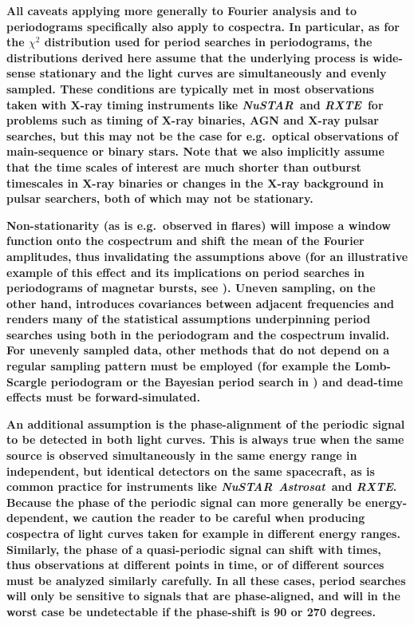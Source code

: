\documentclass[12pt]{emulateapj}
\newcommand{\project}[1]{\textsl{#1}}
\newcommand{\nustar}{\project{NuSTAR}\xspace}
\newcommand{\rxte}{\project{RXTE}\xspace}
\newcommand{\astrosat}{\project{Astrosat}\xspace}
\begin{document}
\textbf{All caveats applying more generally to Fourier analysis and to periodograms specifically also apply to cospectra. In particular, as for the $\chi^2$ distribution used for period searches in periodograms, the distributions derived here assume that the underlying process is wide-sense stationary and the light curves are simultaneously and evenly sampled. These conditions are typically met in most observations taken with X-ray timing instruments like \nustar\ and \rxte\ for problems such as timing of X-ray binaries, AGN and X-ray pulsar searches, but this may not be the case for e.g.\ optical observations of main-sequence or binary stars. Note that we also implicitly assume that the time scales of interest are much shorter than outburst timescales in X-ray binaries or changes in the X-ray background in pulsar searchers, both of which may not be stationary.}

\textbf{Non-stationarity (as is e.g.\ observed in flares) will impose a window function onto the cospectrum and shift the mean of the Fourier amplitudes, thus invalidating the assumptions above (for an illustrative example of this effect and its implications on period searches in periodograms of magnetar bursts, see \citealt{huppenkothen2013}). Uneven sampling, on the other hand, introduces covariances between adjacent frequencies and renders many of the statistical assumptions underpinning period searches using both in the periodogram and the cospectrum invalid. For unevenly sampled data, other methods that do not depend on a regular sampling pattern must be employed (for example the Lomb-Scargle periodogram \citep{lomb1976, scargle1982} or the Bayesian period search in \citet{gregory1992}) and dead-time effects must be forward-simulated.}

\textbf{An additional assumption is the phase-alignment of the periodic signal to be detected in both light curves. This is always true when the same source is observed simultaneously in the same energy range in independent, but identical detectors on the same spacecraft, as is common practice for instruments like \nustar\, \astrosat\ and \rxte. Because the phase of the periodic signal can more generally be energy-dependent, we caution the reader to be careful when producing cospectra of light curves taken for example in different energy ranges. Similarly, the phase of a quasi-periodic signal can shift with times, thus observations at different points in time, or of different sources must be analyzed similarly carefully. In all these cases, period searches will only be sensitive to signals that are phase-aligned, and will in the worst case be undetectable if the phase-shift is 90 or 270 degrees. }
\end{document}
